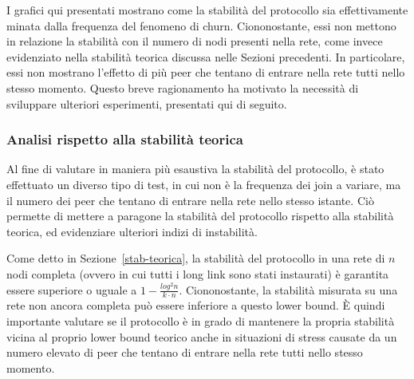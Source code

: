 \documentclass[prodmode,acmtap]{acmlarge}
\begin{document}
I grafici qui presentati mostrano come la stabilità del protocollo sia effettivamente minata dalla frequenza del fenomeno di churn. Ciononostante, essi non mettono in relazione la stabilità con il numero di nodi presenti nella rete, come invece evidenziato nella stabilità teorica discussa nelle Sezioni precedenti. In particolare, essi non mostrano l'effetto di più peer che tentano di entrare nella rete tutti nello stesso momento. Questo breve ragionamento ha motivato la necessità di sviluppare ulteriori esperimenti, presentati qui di seguito.



\subsubsection{Analisi rispetto alla stabilità teorica}
Al fine di valutare in maniera più esaustiva la stabilità del protocollo, è stato effettuato un diverso tipo di test, in cui non è la frequenza dei join a variare, ma il numero dei peer che tentano di entrare nella rete nello stesso istante. Ciò permette di mettere a paragone la stabilità del protocollo rispetto alla stabilità teorica, ed evidenziare ulteriori indizi di instabilità.

Come detto in Sezione~\ref{stab-teorica}, la stabilità del protocollo in una rete di $n$ nodi completa (ovvero in cui tutti i long link sono stati instaurati) è garantita essere superiore o uguale a $1 - \frac{log^2n}{k \cdot n}$. Ciononostante, la stabilità misurata su una rete non ancora completa può essere inferiore a questo lower bound. È quindi importante valutare se il protocollo è in grado di mantenere la propria stabilità vicina al proprio lower bound teorico anche in situazioni di stress causate da un numero elevato di peer che tentano di entrare nella rete tutti nello stesso momento.
\end{document}
